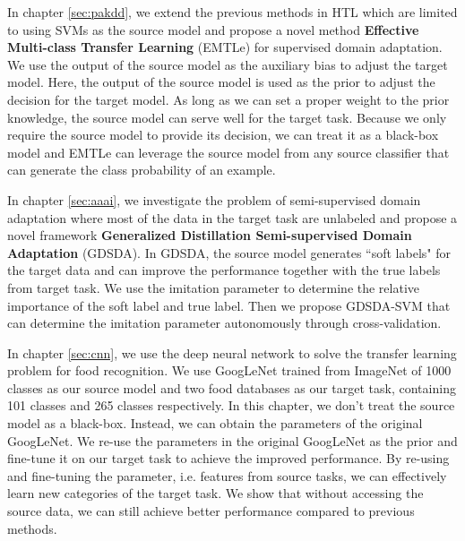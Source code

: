In chapter \ref{sec:pakdd}, we extend the previous methods in HTL which are limited to using SVMs as the source model and propose a novel method \textbf{Effective Multi-class Transfer Learning} (EMTLe) for supervised domain adaptation. We use the output of the source model as the auxiliary bias to adjust the target model. Here, the output of the source model is used as the prior to adjust the decision for the target model. As long as we can set a proper weight to the prior knowledge, the source model can serve well for the target task. Because we only require the source model to provide its decision, we can treat it as a black-box model and EMTLe can leverage the source model from any source classifier that can generate the class probability of an example.

In chapter \ref{sec:aaai}, we investigate the problem of semi-supervised domain adaptation where most of the data in the target task are unlabeled and propose a novel framework \textbf{Generalized Distillation Semi-supervised Domain Adaptation} (GDSDA). In GDSDA, the source model generates ``soft labels" for the target data and can improve the performance together with the true labels from target task. We use the imitation parameter to determine the relative importance of the soft label and true label. Then we propose GDSDA-SVM that can determine the imitation parameter autonomously through cross-validation.

In chapter \ref{sec:cnn}, we use the deep neural network to solve the transfer learning problem for food recognition. We use GoogLeNet trained from ImageNet of 1000 classes as our source model and two food databases as our target task, containing 101 classes and 265 classes respectively. In this chapter, we don't treat the source model as a black-box. Instead, we can obtain the parameters of the original GoogLeNet. We re-use the parameters in the original GoogLeNet as the prior and fine-tune it on our target task to achieve the improved performance. By re-using and fine-tuning the parameter, i.e. features from source tasks, we can effectively learn new categories of the target task. We show that without accessing the source data, we can still achieve better performance compared to previous methods.